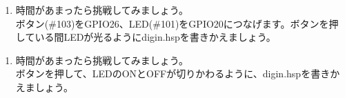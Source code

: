 \begin{tcolorbox}[title=\useOmetoiAlpha]
\begin{enumerate}
\item 時間があまったら挑戦してみましょう。\\ボタン(\#103)をGPIO26、LED(\#101)をGPIO20につなげます。ボタンを押している間LEDが光るようにdigin.hspを書きかえましょう。
\end{enumerate}
\end{tcolorbox}
\begin{tcolorbox}[title=\useOmetoiAlpha]
\begin{enumerate}
\item 時間があまったら挑戦してみましょう。\\ボタンを押して、LEDのONとOFFが切りかわるように、digin.hspを書きかえましょう。
\end{enumerate}
\end{tcolorbox}
